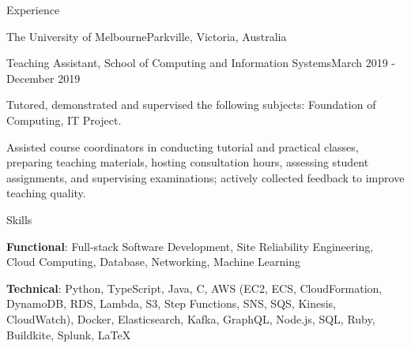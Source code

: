\documentclass{xsha}
\begin{document}
\begin{xsection}{Experience}
\begin{xheading}{The University of Melbourne}{Parkville, Victoria, Australia}
\begin{xsubheading}{Teaching Assistant, School of Computing and Information Systems}{March 2019 - December 2019}
\item Tutored, demonstrated and supervised the following subjects: Foundation of Computing, IT Project.
\item Assisted course coordinators in conducting tutorial and practical classes, preparing teaching materials, hosting consultation hours, assessing student assignments, and supervising examinations; actively collected feedback to improve teaching quality.
\end{xsubheading}
\end{xheading}

\end{xsection}

\begin{xsection}{Skills}
\item \textbf{Functional}: Full-stack Software Development, Site Reliability Engineering, Cloud Computing, Database, Networking, Machine Learning
\item \textbf{Technical}: Python, TypeScript, Java, C, AWS (EC2, ECS, CloudFormation, DynamoDB, RDS, Lambda, S3, Step Functions, SNS, SQS, Kinesis, CloudWatch), Docker, Elasticsearch, Kafka, GraphQL, Node.js, SQL, Ruby, Buildkite, Splunk, \LaTeX
\end{xsection}

\end{document}
